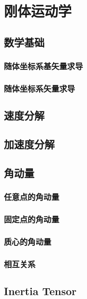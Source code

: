 \chapter{刚体运动学}
\section{数学基础}
\subsection{随体坐标系基矢量求导}
\subsection{随体坐标系矢量求导}
\section{速度分解}
\section{加速度分解}
\section{角动量}
\subsection{任意点的角动量}
\subsection{固定点的角动量}
\subsection{质心的角动量}
\subsection{相互关系}
\section{Inertia Tensor}
